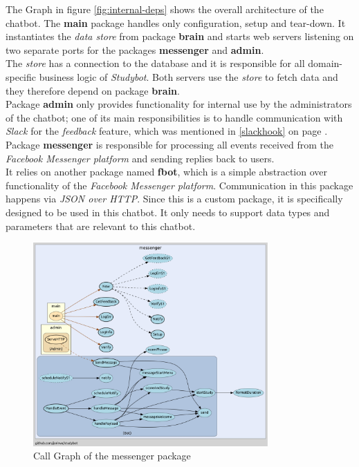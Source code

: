 The Graph in figure \ref{fig:internal-deps} shows the overall architecture of the chatbot.
The \textbf{main} package handles only configuration, setup and tear-down.
It instantiates the \emph{data store} from package \textbf{brain}
and starts web servers listening on two separate ports for the packages \textbf{messenger} and \textbf{admin}.
\\
The \emph{store} has a connection to the database and it is responsible for all domain-specific business logic of \emph{Studybot}.
Both servers use the \emph{store} to fetch data and they therefore depend on package \textbf{brain}.
\\
Package \textbf{admin} only provides functionality for internal use by the administrators of the chatbot;
one of its main responsibilities is to handle communication with \emph{Slack}
for the \emph{feedback} feature, which was mentioned in \ref{slackhook} on page \pageref{slackhook}.
\\
Package \textbf{messenger} is responsible for processing all events received from the \emph{Facebook Messenger platform}
and sending replies back to users.
\\
It relies on another package named \textbf{fbot},
which is a simple abstraction over functionality of the \emph{Facebook Messenger platform}.
Communication in this package happens via \emph{JSON over HTTP}.
Since this is a custom package,
it is specifically designed to be used in this chatbot.
It only needs to support data types and parameters that are relevant to this chatbot.
\\

\begin{figure}[h]
  \centering
  \includegraphics[width=0.8\textwidth]{images/call-graph-messenger.png}
	\caption{Call Graph of the messenger package\protect\footnotemark}
	\label{fig:call-graph-messenger}
\end{figure}


